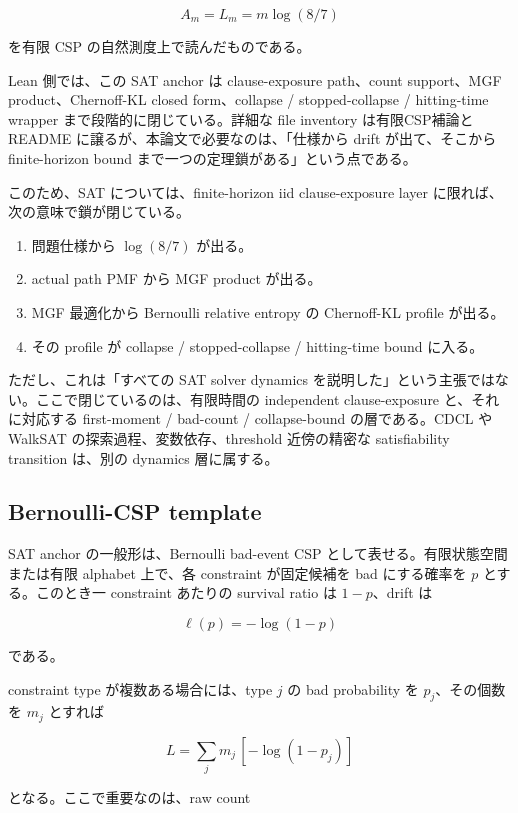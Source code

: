 \documentclass[12pt,a4paper]{article}
\begin{document}
\[
A_{m}=L_{m}=m\log(8/7)
\]

を有限 CSP の自然測度上で読んだものである。

Lean 側では、この SAT anchor は clause-exposure path、count support、MGF product、Chernoff-KL closed form、collapse / stopped-collapse / hitting-time wrapper まで段階的に閉じている。詳細な file inventory は有限CSP補論と README に譲るが、本論文で必要なのは、「仕様から drift が出て、そこから finite-horizon bound まで一つの定理鎖がある」という点である。

このため、SAT については、finite-horizon iid clause-exposure layer に限れば、次の意味で鎖が閉じている。

\begin{enumerate}
\def\labelenumi{\arabic{enumi}.}
\tightlist
\item
  問題仕様から \(\log(8/7)\) が出る。
\item
  actual path PMF から MGF product が出る。
\item
  MGF 最適化から Bernoulli relative entropy の Chernoff-KL profile が出る。
\item
  その profile が collapse / stopped-collapse / hitting-time bound に入る。
\end{enumerate}

ただし、これは「すべての SAT solver dynamics を説明した」という主張ではない。ここで閉じているのは、有限時間の independent clause-exposure と、それに対応する first-moment / bad-count / collapse-bound の層である。CDCL や WalkSAT の探索過程、変数依存、threshold 近傍の精密な satisfiability transition は、別の dynamics 層に属する。

\subsection{Bernoulli-CSP template}\label{bernoulli-csp-template}

SAT anchor の一般形は、Bernoulli bad-event CSP として表せる。有限状態空間または有限 alphabet 上で、各 constraint が固定候補を bad にする確率を \(p\) とする。このとき一 constraint あたりの survival ratio は \(1-p\)、drift は

\[
\ell(p)=-\log(1-p)
\]

である。

constraint type が複数ある場合には、type \(j\) の bad probability を \(p_{j}\)、その個数を \(m_{j}\) とすれば

\[
L = \sum_{j} m_{j}\,[-\log(1-p_{j})]
\]

となる。ここで重要なのは、raw count
\end{document}
